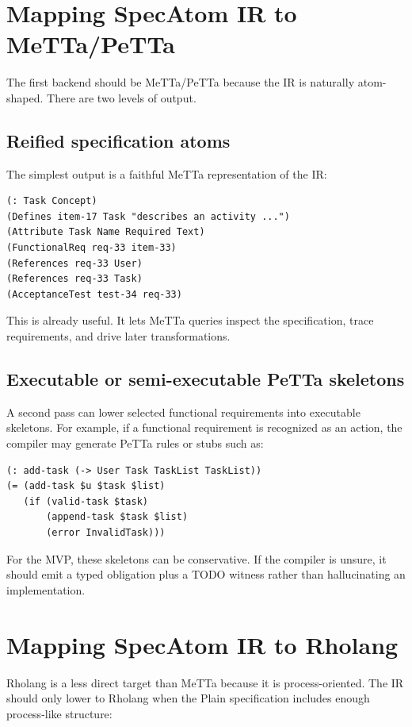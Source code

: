 \documentclass[11pt]{article}
\begin{document}
\section{Mapping SpecAtom IR to MeTTa/PeTTa}

The first backend should be MeTTa/PeTTa because the IR is naturally atom-shaped.
There are two levels of output.

\subsection{Reified specification atoms}

The simplest output is a faithful MeTTa representation of the IR:

\begin{verbatim}
(: Task Concept)
(Defines item-17 Task "describes an activity ...")
(Attribute Task Name Required Text)
(FunctionalReq req-33 item-33)
(References req-33 User)
(References req-33 Task)
(AcceptanceTest test-34 req-33)
\end{verbatim}

This is already useful. It lets MeTTa queries inspect the specification, trace
requirements, and drive later transformations.

\subsection{Executable or semi-executable PeTTa skeletons}

A second pass can lower selected functional requirements into executable
skeletons. For example, if a functional requirement is recognized as an action,
the compiler may generate PeTTa rules or stubs such as:

\begin{verbatim}
(: add-task (-> User Task TaskList TaskList))
(= (add-task $u $task $list)
   (if (valid-task $task)
       (append-task $task $list)
       (error InvalidTask)))
\end{verbatim}

For the MVP, these skeletons can be conservative. If the compiler is unsure, it
should emit a typed obligation plus a TODO witness rather than hallucinating an
implementation.

\section{Mapping SpecAtom IR to Rholang}

Rholang is a less direct target than MeTTa because it is process-oriented. The
IR should only lower to Rholang when the Plain specification includes enough
process-like structure:
\end{document}
